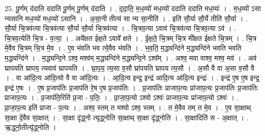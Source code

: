 \documentclass[17pt]{extarticle}
\begin{document}
25. पू॒र्णम् द॑दाति ददाति पू॒र्णम् पू॒र्णम् द॑दाति । . द॒दा॒ति॒ म॒ध॒व्यो॑ मध॒व्यो॑ ददाति ददाति मध॒व्यः॑ । . म॒ध॒व्यो॑ ऽसा न्यसानि मध॒व्यो॑ मध॒व्यो॑ ऽसानि । . अ॒सा॒नी तीत्य॑ सा न्य सा॒नीति॑ । . इति॑ सौ॒र्या सौ॒र्ये तीति॑ सौ॒र्या । . सौ॒र्या चि॒त्रव॑त्या चि॒त्रव॑त्या सौ॒र्या सौ॒र्या चि॒त्रव॑त्या । . चि॒त्रव॒त्या ऽवाव॑ चि॒त्रव॑त्या चि॒त्रव॒त्या ऽव॑ । . चि॒त्रव॒त्येति॑ चि॒त्र - व॒त्या॒ । . अवे᳚क्षत ईक्ष॒ते ऽवावे᳚ क्षते । . ई॒क्ष॒ते॒ चि॒त्रम् चि॒त्र मी᳚क्षत ईक्षते चि॒त्रम् । . चि॒त्र मे॒वैव चि॒त्रम् चि॒त्र मे॒व । . ए॒व भ॑वति भव त्ये॒वैव भ॑वति । . भ॒व॒ति॒ म॒द्ध्यन्दि॑ने म॒द्ध्यन्दि॑ने भवति भवति म॒द्ध्यन्दि॑ने । . म॒द्ध्यन्दि॒ने ऽश्व॒ मश्व॑म् म॒द्ध्यन्दि॑ने म॒द्ध्यन्दि॒ने ऽश्व᳚म् । . अश्व॒ मवा वाश्व॒ मश्व॒ मव॑ । . अव॑ घ्रापयति घ्रापय॒ त्यवाव॑ घ्रापयति । . घ्रा॒प॒य॒ त्य॒सा व॒सौ घ्रा॑पयति घ्रापय त्य॒सौ । . अ॒सौ वै वा अ॒सा व॒सौ वै । . वा आ॑दि॒त्य आ॑दि॒त्यो वै वा आ॑दि॒त्यः । . आ॒दि॒त्य इन्द्र॒ इन्द्र॑ आदि॒त्य आ॑दि॒त्य इन्द्रः॑ । . इन्द्र॑ ए॒ष ए॒ष इन्द्र॒ इन्द्र॑ ए॒षः । . ए॒ष प्र॒जाप॑तिः प्र॒जाप॑ति रे॒ष ए॒ष प्र॒जाप॑तिः । . प्र॒जाप॑तिः प्राजाप॒त्यः प्रा॑जाप॒त्यः प्र॒जाप॑तिः प्र॒जाप॑तिः प्राजाप॒त्यः । . प्र॒जाप॑ति॒रिति॑ प्र॒जा - प॒तिः॒ । . प्रा॒जा॒प॒त्यो ऽश्वो ऽश्वः॑ प्राजाप॒त्यः प्रा॑जाप॒त्यो ऽश्वः॑ । . प्रा॒जा॒प॒त्य इति॑ प्राजा - प॒त्यः । . अश्व॒ स्तम् त मश्वो ऽश्व॒ स्तम् । . त मे॒वैव तम् त मे॒व । . ए॒व सा॒क्षाथ् सा॒क्षा दे॒वैव सा॒क्षात् । . सा॒क्षा दृ॑द्ध्नो त्यृद्ध्नोति सा॒क्षाथ् सा॒क्षा दृ॑द्ध्नोति । . सा॒क्षादिति॑ स - अ॒क्षात् । . ऋ॒द्ध्नो॒तीत्यृ॑द्ध्नोति । \newline
\end{document}
